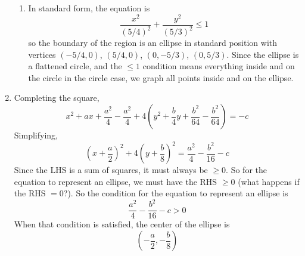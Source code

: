 \documentclass{article}
\newcommand{\ds}{\displaystyle}
\begin{document}
\begin{enumerate}
\begin{enumerate}
  \item %
    In standard form, the equation is 
    \begin{equation*}
      \frac{x^2}{(5/4)^2} + \frac{y^2}{(5/3)^2} \le 1
    \end{equation*}
    so the boundary of the region is an ellipse in standard position
    with vertices $(-5/4,0)$, $(5/4,0)$, $(0,-5/3)$, $(0,5/3)$.  Since
    the ellipse is a flattened circle, and the $\le 1$ condition means
    everything inside and on the circle in the circle case, we graph
    all points inside and on the ellipse.
  \end{enumerate}
\item %
  Completing the square,
  \begin{equation*}
    x^2+ax + \frac{a^2}{4} - \frac{a^2}{4} + 
    4\left(y^2 + \frac{b}{4} y + \frac{b^2}{64} -
    \frac{b^2}{64}\right)
    = -c
  \end{equation*}
  Simplifying,
  \begin{equation*}
    \left(x+\frac{a}{2}\right)^2 + 4\left(y+\frac{b}{8}\right)^2 = 
    \frac{a^2}{4} - \frac{b^2}{16} - c
  \end{equation*}
  Since the LHS is a sum of squares, it must always be $\ge 0$.  So
  for the equation to represent an ellipse, we must have the RHS $\ge
  0$ (what happens if the RHS $=0$?).  So the condition for the
  equation to represent an ellipse is
  \begin{equation*}
    \frac{a^2}{4} - \frac{b^2}{16} - c > 0
  \end{equation*}
  When that condition is satisfied, the center of the ellipse is 
  \begin{equation*}
    \left(-\frac{a}{2},-\frac{b}{8}\right)
  \end{equation*}
\end{enumerate}
\end{document}
